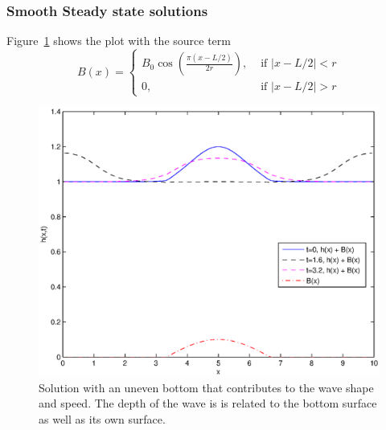 

\subsubsection{Smooth Steady state solutions} 

\label{subsub:smooth_steady_state_solutions}

Figure~\ref{fig:Figures_steadySolutionsp1_n_is_80_a_0} shows the plot with the source term 
\begin{equation}
	B(x) = 
	\begin{cases}
		B_0 \cos \left( \frac{\pi(x-L/2)}{2r} \right), &\text{ if }|x-L/2|<r\\
		0, &\text{ if }|x-L/2|>r 
	\end{cases}
	\label{eq:bxEquation} 
\end{equation}

\begin{figure}
	[htbp] \centering 
	\includegraphics[width=\MyWidth]{Figures/steadySolutionsp1_n_is_80_a_0.eps} \caption{Solution with an uneven bottom that contributes to the wave shape and speed. The depth of the wave is is related to the bottom surface as well as its own surface.} \label{fig:Figures_steadySolutionsp1_n_is_80_a_0} 
\end{figure}

